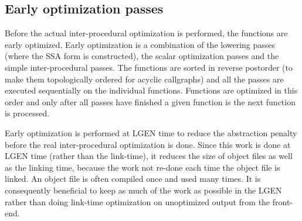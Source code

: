 \documentclass[final]{ols}
\begin{document}
\subsection{Early optimization passes}
\label{earlyopts}
Before the actual inter-procedural optimization is performed, the functions are
early optimized.  Early optimization is a combination of the lowering passes
(where the SSA form is constructed), the scalar optimization passes and the
simple inter-procedural passes.  The functions are sorted in reverse postorder
(to make them topologically ordered for acyclic callgraphs) and all the passes
are executed sequentially on the individual functions. Functions are optimized
in this order and only after all passes have finished a given function is the
next function is processed.

Early optimization is performed at LGEN time to
reduce the abstraction penalty before the real inter-procedural
optimization is done.  Since this work is done at LGEN time
(rather than the link-time), it reduces the size of object files as well as the linking
time, because the work not re-done each time the object file is linked.  An object file 
is often compiled once and used many times. It is consequently beneficial to keep as
much of the work as possible in the LGEN rather than doing  link-time
optimization on unoptimized output from the front-end.
\end{document}
